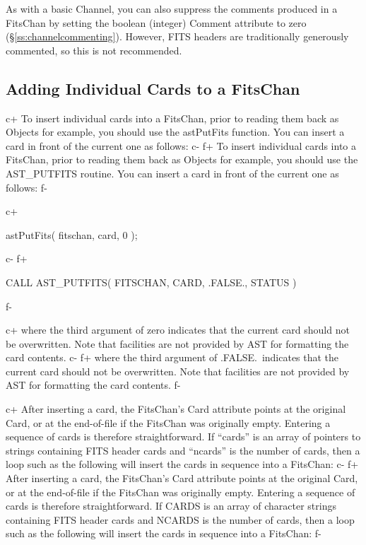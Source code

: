 \documentclass[twoside,11pt]{starlink}
\providecommand{\secref}[1]{\S\ref{#1}}
\begin{document}
{As with a basic Channel, you can also suppress the comments produced
in a FitsChan by setting the boolean (integer) Comment attribute to
zero (\secref{ss:channelcommenting}). However, FITS headers are
traditionally generously commented, so this is not recommended.

\subsection{\label{ss:addingfitscards}Adding Individual Cards to a FitsChan}

c+
To insert individual cards into a FitsChan, prior to reading them back
as Objects for example, you should use the astPutFits function. You
can insert a card in front of the current one as follows:
c-
f+
To insert individual cards into a FitsChan, prior to reading them back
as Objects for example, you should use the AST\_PUTFITS routine. You
can insert a card in front of the current one as follows:
f-

c+
\small
\begin{terminalv}
astPutFits( fitschan, card, 0 );
\end{terminalv}
\normalsize
c-
f+
\small
\begin{terminalv}
      CALL AST_PUTFITS( FITSCHAN, CARD, .FALSE., STATUS )
\end{terminalv}
\normalsize
f-

c+
where the third argument of zero indicates that the current card
should not be overwritten. Note that facilities are not provided by
AST for formatting the card contents.
c-
f+
where the third argument of .FALSE.\ indicates that the current card
should not be overwritten. Note that facilities are not provided by
AST for formatting the card contents.
f-

c+
After inserting a card, the FitsChan's Card attribute points at the
original Card, or at the end-of-file if the FitsChan was originally
empty. Entering a sequence of cards is therefore straightforward. If
``cards'' is an array of pointers to strings containing FITS header
cards and ``ncards'' is the number of cards, then a loop such as the
following will insert the cards in sequence into a FitsChan:
c-
f+
After inserting a card, the FitsChan's Card attribute points at the
original Card, or at the end-of-file if the FitsChan was originally
empty. Entering a sequence of cards is therefore straightforward. If
CARDS is an array of character strings containing FITS header cards
and NCARDS is the number of cards, then a loop such as the following
will insert the cards in sequence into a FitsChan:
f-

}
\end{document}
